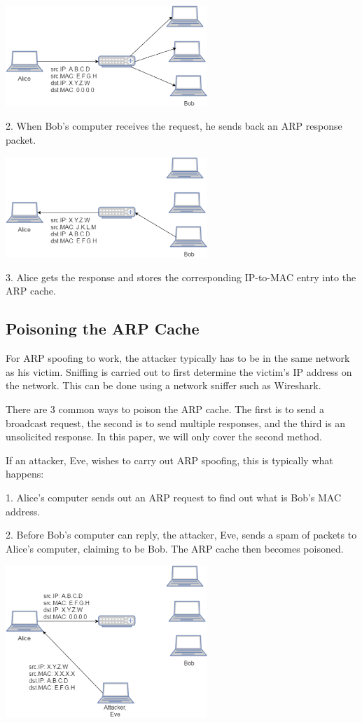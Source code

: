 \documentclass{acm_proc_article-sp}
\begin{document}
\includegraphics[width=3in]{ARP_Request.eps}

2. When Bob's computer receives the request, he sends back an ARP response packet. 

\includegraphics[width=3in]{ARP_Response.eps}

3. Alice gets the response and stores the corresponding IP-to-MAC entry into the ARP cache. 


\subsection{Poisoning the ARP Cache}
For ARP spoofing to work, the attacker typically has to be in the same network as his victim\cite{blackhat:arp5}. Sniffing is carried out to first determine the victim's IP address on the network. This can be done using a network sniffer such as Wireshark.  

There are 3 common ways to poison the ARP cache. The first is to send a broadcast request, the second is to send multiple responses, and the third is an unsolicited response. In this paper, we will only cover the second method\cite{wagner:arp4}.

If an attacker, Eve, wishes to carry out ARP spoofing, this is typically what happens: 

1. Alice's computer sends out an ARP request to find out what is Bob's MAC address. 

2. Before Bob's computer can reply, the attacker, Eve, sends a spam of packets to Alice's computer, claiming to be Bob. The ARP cache then becomes poisoned. 

\includegraphics[width=3in]{Poisoned_ARP.eps}
\end{document}

